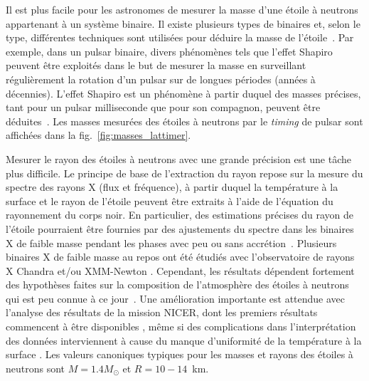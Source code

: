 Il est plus facile pour les astronomes de mesurer la masse d'une étoile à 
neutrons appartenant à un système binaire. Il existe plusieurs types de 
binaires et, selon le type, différentes techniques sont utilisées 
pour déduire la masse de l'étoile~\cite{Haensel2007}.
Par exemple, dans un pulsar binaire, divers phénomènes tels que
l'effet Shapiro~\cite{Shapiro1964} peuvent être exploités dans le but de 
mesurer la masse en surveillant régulièrement la rotation d'un pulsar sur de 
longues périodes (années à décennies). L'effet Shapiro est un phénomène à
partir duquel des masses précises, tant pour un pulsar milliseconde que pour 
son compagnon, peuvent être déduites~\cite{Demorest2010,Cromartie2020}. 
Les masses mesurées des étoiles à neutrons par le \textit{timing} de pulsar 
sont affichées dans la fig.~\ref{fig:masses_lattimer}. 

Mesurer le rayon des étoiles à neutrons avec une grande précision est une tâche 
plus difficile. 
Le principe de base de l'extraction du rayon repose sur la mesure du 
spectre des rayons X (flux et fréquence), à partir duquel la température à la 
surface et le rayon de l'étoile peuvent être extraits à l'aide de l'équation 
du rayonnement du corps noir. 
En particulier, des estimations précises du rayon de l'étoile pourraient être 
fournies par des ajustements du spectre dans les binaires X de faible masse 
pendant les phases avec peu ou sans accrétion~\cite{Brown1998}.
%
Plusieurs binaires X de faible masse au repos ont été étudiés avec
l'observatoire de rayons X Chandra et/ou 
XMM-Newton \cite{Heinke2014,Servillat2012,Guillot2014,Guillot2013}.
%
Cependant, les résultats dépendent fortement des hypothèses faites sur la 
composition de l'atmosphère des étoiles à neutrons qui est peu 
connue à ce jour~\cite{Steiner2018}. 
Une amélioration importante est attendue avec l'analyse des résultats de la 
mission NICER, dont les premiers résultats commencent à être disponibles 
\cite{Bogdanov2019a,Bogdanov2019b,Miller2019,Raaijmakers2019,Riley2019}, 
même si des complications dans l'interprétation des données interviennent à
cause du manque d'uniformité de la température à la surface 
\cite{Bogdanov2019a,Bogdanov2019b,Miller2019,Raaijmakers2019,Riley2019}. 
Les valeurs canoniques typiques pour les masses et rayons des étoiles à 
neutrons sont $M = 1.4M_\odot$ et $R = 10-14$~km. 


